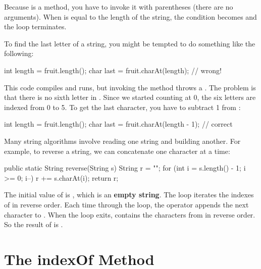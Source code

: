 
Because  is a method, you have to invoke it with parentheses (there are no arguments).
When  is equal to the length of the string, the condition becomes  and the loop terminates.

To find the last letter of a string, you might be tempted to do something like the following:

\begin{code}
int length = fruit.length();
char last = fruit.charAt(length);      // wrong!
\end{code}


This code compiles and runs, but invoking the  method throws a .
The problem is that there is no sixth letter in .
Since we started counting at 0, the six letters are indexed from 0 to 5.
To get the last character, you have to subtract 1 from :

\begin{code}
int length = fruit.length();
char last = fruit.charAt(length - 1);  // correct
\end{code}

Many string algorithms involve reading one string and building another.
For example, to reverse a string, we can concatenate one character at a time:

\begin{code}
public static String reverse(String s) {
    String r = "";
    for (int i = s.length() - 1; i >= 0; i--) {
        r += s.charAt(i);
    }
    return r;
}
\end{code}


The initial value of  is , which is an {\bf empty string}.
The loop iterates the indexes of  in reverse order.
Each time through the loop, the \java{+=} operator appends the next character to .
When the loop exits,  contains the characters from  in reverse order.
So the result of  is .


\section{The indexOf Method}
\label{loops-strings_indexmethod}

